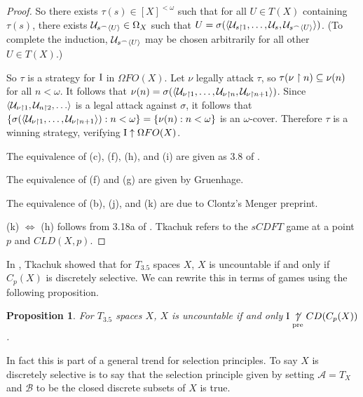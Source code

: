 \documentclass{amsart}
\theoremstyle{plain}
\newtheorem{proposition}[theorem]{Proposition}
\theoremstyle{definition}
\theoremstyle{remark}
\theoremstyle{plain}
\theoremstyle{definition}
\theoremstyle{remark}
\begin{document}
\begin{proof}
 So there exists \(\tau(s)\in[X]^{<\omega}\) such that for all \(U\in T(X)\) containing \(\tau(s)\), there exists \(\mathcal{U}_{s{^\frown}\langle U\rangle}\in\Omega_X\) such that \(U=\sigma(\langle\mathcal{U}_{s\restriction 1},\dots,\mathcal{U}_s,\mathcal{U}_{s{^\frown}\langle U\rangle}\rangle)\). 
 (To complete the induction, \(\mathcal{U}_{s{^\frown}\langle U\rangle}\) may be chosen arbitrarily for all other \(U\in T(X)\).)

 So \(\tau\) is a strategy for \(\mathrm{I}\) in \(\Omega FO(X)\). 
 Let \(\nu\) legally attack \(\tau\), so \(\tau(\nu\restriction n)\subseteq \nu(n)\) for all \(n<\omega\). 
 It follows that \(\nu(n)=\sigma(\langle\mathcal{U}_{\nu\restriction 1},\dots,\mathcal{U}_{\nu\restriction n},\mathcal{U}_{\nu\restriction n+1}\rangle)\). 
 Since \(\<\mc U_{\nu\rest 1},\mc U_{n\rest 2},\dots\>\) is a legal attack against \(\sigma\), it follows that \(\{\sigma(\langle\mathcal{U}_{\nu\restriction 1},\dots,\mathcal{U}_{\nu\restriction n+1}\rangle):n<\omega\}=\{\nu(n):n<\omega\}\) is an \(\omega\)-cover. 
 Therefore \(\tau\) is a winning strategy, verifying \(\mathrm{I}\uparrow\Omega FO(X)\).

 The equivalence of (c), (f), (h), and (i) are given as 3.8 of \cite{Tkachuk3}.

 The equivalence of (f) and (g) are given by Gruenhage\cite{Gruenhage1976}.
  
 The equivalence of (b), (j), and (k) are due to Clontz's Menger preprint\cite{Clontz1}.

 (k) \(\Leftrightarrow\) (h) follows from 3.18a of \cite{Tkachuk3}.
 Tkachuk refers to the \(sCDFT\) game at a point \(p\) and \(CLD(X,p)\).
\end{proof}

In \cite{Tkachuk2}, Tkachuk showed that for \(T_{3.5}\) spaces \(X\), \(X\) is uncountable if and only if \(C_p(X)\) is discretely selective.
We can rewrite this in terms of games using the following proposition.

\begin{proposition}
  For \(T_{3.5}\) spaces \(X\), \(X\) is uncountable if and only \(\mathrm{I}\underset{\text{pre}}{\not\uparrow} CD(C_p(X))\).
\end{proposition}

In fact this is part of a general trend for selection principles.
To say \(X\) is discretely selective is to say that the selection principle given by setting \(\mathcal{A} = T_X\) and \(\mathcal{B}\) to be the closed discrete subsets of \(X\) is true.
\end{document}

